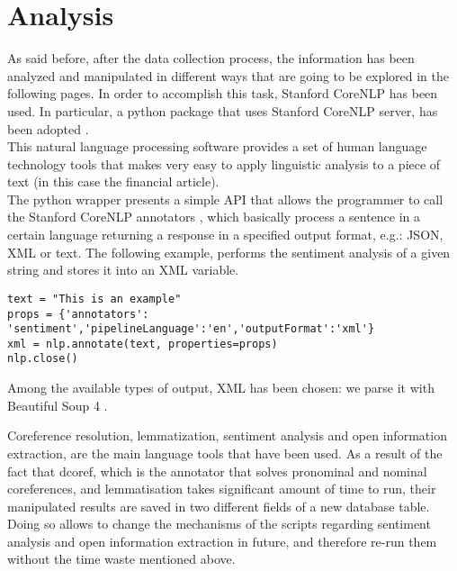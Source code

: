 \section{Analysis}
As said before, after the data collection process, the information has been analyzed and manipulated in different ways that are going to be explored in the following pages. In order to accomplish this task,
Stanford CoreNLP \cite{stanfordcorenlp} has been used. In particular, a python package that uses Stanford CoreNLP server, has been adopted \cite{corenlpwrapper}. \\
This natural language processing software provides a set of human language technology tools that makes very easy to apply linguistic analysis to a piece of text (in this case the financial article). \\
The python wrapper presents a simple API that allows the programmer to call the Stanford CoreNLP annotators \cite{annotators}, which basically process a sentence in a certain language returning a response in a specified output format, e.g.: JSON, XML or text. The following example, performs the sentiment analysis of a given string and stores it into an XML variable.
\begin{verbatim}
text = "This is an example"
props = {'annotators': 'sentiment','pipelineLanguage':'en','outputFormat':'xml'}
xml = nlp.annotate(text, properties=props)
nlp.close()
\end{verbatim}
Among the available types of output, XML has been chosen: we parse it with Beautiful Soup 4 \cite{bs4}. \par 
Coreference resolution, lemmatization, sentiment analysis and open information extraction, are the main language tools that have been used. As a result of the fact that dcoref, which is the annotator that solves pronominal and nominal coreferences, and lemmatisation takes significant amount of time to run, their manipulated results are saved in two different fields of a new database table. Doing so allows to change the mechanisms of the scripts regarding sentiment analysis and open information extraction in future, and therefore re-run them without the time waste mentioned above.



